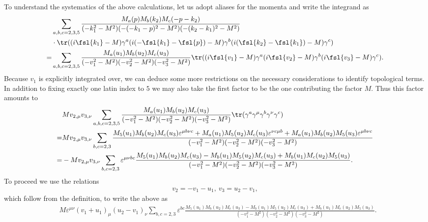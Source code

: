 To understand the systematics of the above calculations, let us adopt aliases for the momenta and write the integrand as
\begin{align*}
	 &\sum\limits_{a, b, c = 2, 3, 5}\frac{M_{a}(p)M_{b}(k_{2})M_{c}(-p - k_{2})}{(-k_{1}^{2} - M^{2})(-(-k_{1} - p)^{2} - M^{2})(-(k_{2} - k_{1})^{2} - M^{2})} \\
	 &\cdot\tr((i\fsl{k_{1}} - M)\gamma^{a}(i(-\fsl{k_{1}} - \fsl{p}) - M)\gamma^{b}(i(\fsl{k_{2}} - \fsl{k_{1}}) - M)\gamma^{c}) \\
	=& \sum\limits_{a, b, c = 2, 3, 5}\frac{M_{a}(u_{1})M_{b}(u_{2})M_{c}(u_{3})}{(-v_{1}^{2} - M^{2})(-v_{2}^{2} - M^{2})(-v_{3}^{2} - M^{2})}\tr((i\fsl{v_{1}} - M)\gamma^{a}(i\fsl{v_{2}} - M)\gamma^{b}(i\fsl{v_{3}} - M)\gamma^{c}).
\end{align*}
Because $v_{1}$ is explicitly integrated over, we can deduce some more restrictions on the necessary considerations to identify topological terms. In addition to fixing exactly one latin index to $5$ we may also take the first factor to be the one contributing the factor $M$. Thus this factor amounts to
\begin{align*}
	 &Mv_{2, \mu}v_{3, \nu}\sum\limits_{a, b, c = 2, 3, 5}\frac{M_{a}(u_{1})M_{b}(u_{2})M_{c}(u_{3})}{(-v_{1}^{2} - M^{2})(-v_{2}^{2} - M^{2})(-v_{3}^{2} - M^{2})}\tr(\gamma^{a}\gamma^{\mu}\gamma^{b}\gamma^{\nu}\gamma^{c}) \\
	=& Mv_{2, \mu}v_{3, \nu}\sum\limits_{b, c = 2, 3}\frac{M_{5}(u_{1})M_{b}(u_{2})M_{c}(u_{3})\varepsilon^{\mu b\nu c} + M_{a}(u_{1})M_{5}(u_{2})M_{c}(u_{3})\varepsilon^{\nu c\mu b} + M_{a}(u_{1})M_{b}(u_{2})M_{5}(u_{3})\varepsilon^{\mu b\nu c}}{(-v_{1}^{2} - M^{2})(-v_{2}^{2} - M^{2})(-v_{3}^{2} - M^{2})} \\
	=& -Mv_{2, \mu}v_{3, \nu}\sum\limits_{b, c = 2, 3}\varepsilon^{\mu\nu bc}\frac{M_{5}(u_{1})M_{b}(u_{2})M_{c}(u_{3}) - M_{b}(u_{1})M_{5}(u_{2})M_{c}(u_{3}) + M_{b}(u_{1})M_{c}(u_{2})M_{5}(u_{3})}{(-v_{1}^{2} - M^{2})(-v_{2}^{2} - M^{2})(-v_{3}^{2} - M^{2})}.
\end{align*}
To proceed we use the relations
\begin{align*}
	v_{2} = -v_{1} - u_{1},\ v_{3} = u_{2} - v_{1},
\end{align*}
which follow from the definition, to write the above as
\begin{align*}
	 &M\varepsilon^{\mu\nu}(v_{1} + u_{1})_{\mu}(u_{2} - v_{1})_{\nu}\sum\limits_{b, c = 2, 3}\varepsilon^{bc}\frac{M_{5}(u_{1})M_{b}(u_{2})M_{c}(u_{3}) - M_{b}(u_{1})M_{5}(u_{2})M_{c}(u_{3}) + M_{b}(u_{1})M_{c}(u_{2})M_{5}(u_{3})}{(-v_{1}^{2} - M^{2})(-v_{2}^{2} - M^{2})(-v_{3}^{2} - M^{2})}.
\end{align*}
